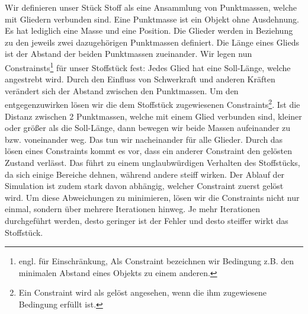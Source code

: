 Wir definieren unser Stück Stoff als eine Ansammlung von Punktmassen, welche mit Gliedern verbunden sind. Eine Punktmasse ist ein Objekt ohne Ausdehnung. Es hat lediglich eine Masse und eine Position. Die Glieder werden in Beziehung zu den jeweils zwei dazugehörigen Punktmassen definiert. Die Länge eines Glieds ist der Abstand der beiden Punktmassen zueinander. Wir legen nun Constrainsts\footnote{engl. für Einschränkung, Als Constraint bezeichnen wir Bedingung z.B. den minimalen Abstand eines Objekts zu einem anderen.} für unser Stoffstück fest: Jedes Glied hat eine Soll-Länge, welche angestrebt wird.\newline\newline
Durch den Einfluss von Schwerkraft und anderen Kräften verändert sich der Abstand zwischen den Punktmassen. Um den entgegenzuwirken lösen wir die dem Stoffstück zugewiesenen Constraints\footnote{Ein Constraint wird als gelöst angesehen, wenn die ihm zugewiesene Bedingung erfüllt ist.}.\newline\newline
Ist die Distanz zwischen 2 Punktmassen, welche mit einem Glied verbunden sind, kleiner oder größer als die Soll-Länge, dann bewegen wir beide Massen aufeinander zu bzw. voneinander weg. Das tun wir nacheinander für alle Glieder. Durch das lösen eines Constraints kommt es vor, dass ein anderer Constraint den gelösten Zustand verlässt. Das führt zu einem unglaubwürdigen Verhalten des Stoffstücks, da sich einige Bereiche dehnen, während andere steiff wirken. Der Ablauf der Simulation ist zudem stark davon abhängig, welcher Constraint zuerst gelöst wird. Um diese Abweichungen zu minimieren, lösen wir die Constraints nicht nur einmal, sondern über mehrere Iterationen hinweg. Je mehr Iterationen durchgeführt werden, desto geringer ist der Fehler und desto steiffer wirkt das Stoffstück.
